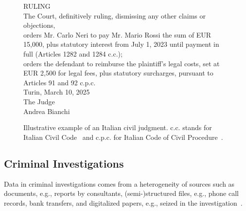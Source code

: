 \begin{figure}[htbp]
\begin{minipage}{0.9\linewidth}
RULING\\
The Court, definitively ruling, dismissing any other claims or objections,\\
orders Mr. Carlo Neri to pay Mr. Mario Rossi the sum of EUR 15,000, plus statutory interest from July 1, 2023 until payment in full (Articles 1282 and 1284 c.c.);\\
orders the defendant to reimburse the plaintiff's legal costs, set at EUR 2,500 for legal fees, plus statutory surcharges, pursuant to Articles 91 and 92 c.p.c.\\[1em]
Turin, March 10, 2025\\
The Judge\\
Andrea Bianchi
\end{minipage}
\caption{Illustrative example of an Italian civil judgment. c.c. stands for Italian Civil Code~\cite{CC} and c.p.c. for Italian Code of Civil Procedure~\cite{CPC}.}
\label{fig:civil-judgment-legal-articles}
\end{figure}




\cite{BELLANDI2024,pozzi_wise_2025,aixia_2023,Agazzi2025DAVE,real_batini2021semantic}
\subsection{Criminal Investigations}
Data in criminal investigations comes from a heterogeneity of sources such as documents, e.g., reports by consultants, (semi-)structured files, e.g., phone call records, bank transfers, and digitalized papers, e.g., seized in the investigation~\cite{pozzi_wise_2025}.


